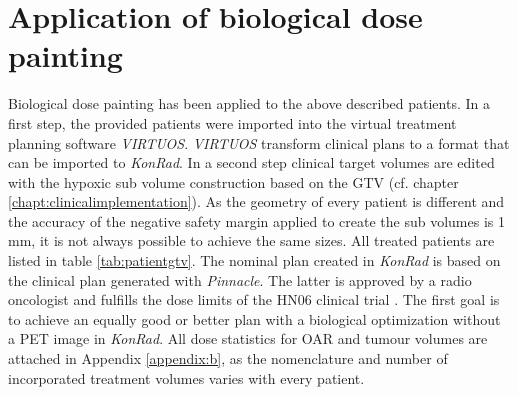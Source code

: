 \section{Application of biological dose painting}
Biological dose painting has been applied to the above described patients. In a first step, the provided patients were imported into the virtual treatment planning software \textit{VIRTUOS}. \textit{VIRTUOS} transform clinical plans to a format that can be imported to \textit{KonRad}. In a second step clinical target volumes are edited with the hypoxic sub volume construction based on the GTV (cf. chapter \ref{chapt:clinicalimplementation}). As the geometry of every patient is different and the accuracy of the negative safety margin applied to create the sub volumes is 1 mm, it is not always possible to achieve the same sizes. All treated patients are listed in table \ref{tab:patientgtv}. The nominal plan created in \textit{KonRad} is based on the clinical plan generated with \textit{Pinnacle}. The latter is approved by a radio oncologist and fulfills the dose limits of the HN06 clinical trial \cite{HN06}. The first goal is to achieve an equally good or better plan with a biological optimization without a PET image in \textit{KonRad}. All dose statistics for OAR and tumour volumes are attached in Appendix \ref{appendix:b}, as the nomenclature and number of incorporated treatment  volumes varies with every patient.
